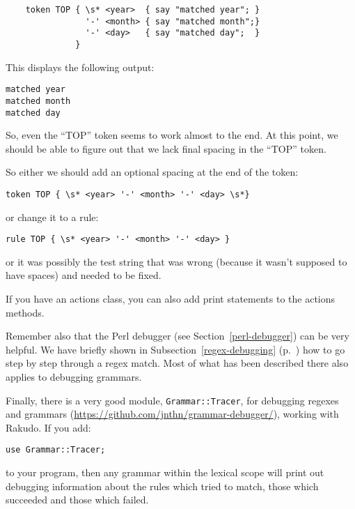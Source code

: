 \begin{verbatim}
    token TOP { \s* <year>  { say "matched year"; }
                '-' <month> { say "matched month";}
                '-' <day>   { say "matched day";  }
              }
\end{verbatim}
 
This displays the following output:

\begin{verbatim}
matched year
matched month
matched day
\end{verbatim}

So, even the ``TOP'' token seems to work almost to the end. At 
this point, we should be able to figure out that we lack 
final spacing in the ``TOP'' token. 

So either we should add an optional spacing at the end of 
the token:

\begin{verbatim}
token TOP { \s* <year> '-' <month> '-' <day> \s*}
\end{verbatim}

or change it to a rule:

\begin{verbatim}
rule TOP { \s* <year> '-' <month> '-' <day> }
\end{verbatim}

or it was possibly the test string that was wrong (because 
it wasn't supposed to have spaces) and needed to be fixed.

If you have an actions class, you can also add print statements 
to the actions methods.

Remember also that the Perl debugger (see 
Section~\ref{perl-debugger}) can be very helpful. We have 
briefly shown in Subsection~\ref{regex-debugging} 
(p.~\pageref{regex-debugging}) how to go step by step 
through a regex match. Most of what has been described 
there also applies to debugging grammars.

Finally, there is a very good module, \verb'Grammar::Tracer', for 
debugging regexes and grammars (\url{https://github.com/jnthn/grammar-debugger/}), working with Rakudo. If you add:

\begin{verbatim}
use Grammar::Tracer;
\end{verbatim}

to your program, then any grammar within the lexical scope will 
print out debugging information about the rules which tried to 
match, those which succeeded and those which failed.


